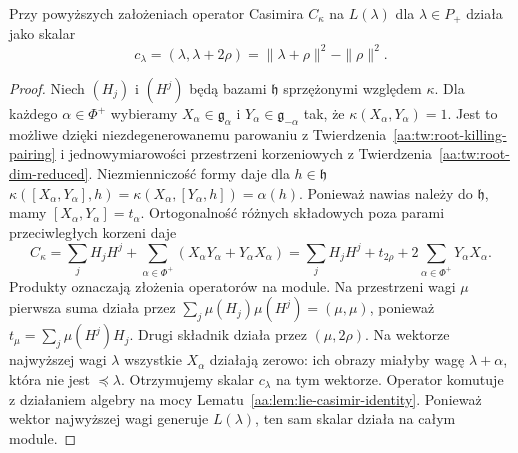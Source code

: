 \begin{lemat}
\label{aa:lem:weyl-casimir-eigenvalue}
Przy powyższych założeniach operator Casimira $C_\kappa$ na $L(\lambda)$ dla $\lambda\in P_+$ działa jako skalar
\[
 c_\lambda=(\lambda,\lambda+2\rho)
 =\|\lambda+\rho\|^2-\|\rho\|^2.
\]
\end{lemat}
\begin{proof}
Niech $(H_j)$ i $(H^j)$ będą bazami $\mathfrak h$ sprzężonymi względem $\kappa$. Dla każdego $\alpha\in\Phi^+$ wybieramy $X_\alpha\in\mathfrak g_\alpha$ i $Y_\alpha\in\mathfrak g_{-\alpha}$ tak, że $\kappa(X_\alpha,Y_\alpha)=1$. Jest to możliwe dzięki niezdegenerowanemu parowaniu z Twierdzenia~\ref{aa:tw:root-killing-pairing} i jednowymiarowości przestrzeni korzeniowych z Twierdzenia~\ref{aa:tw:root-dim-reduced}. Niezmienniczość formy daje dla $h\in\mathfrak h$
$\kappa([X_\alpha,Y_\alpha],h)=\kappa(X_\alpha,[Y_\alpha,h])=\alpha(h)$.
Ponieważ nawias należy do $\mathfrak h$, mamy $[X_\alpha,Y_\alpha]=t_\alpha$. Ortogonalność różnych składowych poza parami przeciwległych korzeni daje
\[
 C_\kappa=\sum_j H_j H^j+
 \sum_{\alpha\in\Phi^+}(X_\alpha Y_\alpha+Y_\alpha X_\alpha)
 =\sum_j H_j H^j+t_{2\rho}
       +2\sum_{\alpha\in\Phi^+}Y_\alpha X_\alpha .
\]
Produkty oznaczają złożenia operatorów na module. Na przestrzeni wagi $\mu$ pierwsza suma działa przez $\sum_j\mu(H_j)\mu(H^j)=(\mu,\mu)$, ponieważ $t_\mu=\sum_j\mu(H^j)H_j$. Drugi składnik działa przez $(\mu,2\rho)$. Na wektorze najwyższej wagi $\lambda$ wszystkie $X_\alpha$ działają zerowo: ich obrazy miałyby wagę $\lambda+\alpha$, która nie jest $\preceq\lambda$. Otrzymujemy skalar $c_\lambda$ na tym wektorze. Operator komutuje z działaniem algebry na mocy Lematu~\ref{aa:lem:lie-casimir-identity}. Ponieważ wektor najwyższej wagi generuje $L(\lambda)$, ten sam skalar działa na całym module.
\end{proof}

